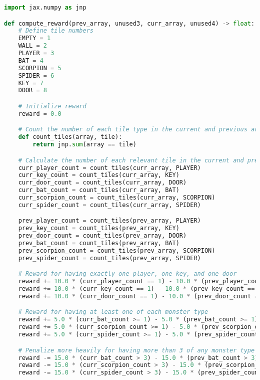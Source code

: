 \begin{tcolorbox}[colback=white, colframe=gray, title=Generated Reward Function Example, breakable]
\begin{lstlisting}[language=Python]
import jax.numpy as jnp

def compute_reward(prev_array, unused3, curr_array, unused4) -> float:
    # Define tile numbers
    EMPTY = 1
    WALL = 2
    PLAYER = 3
    BAT = 4
    SCORPION = 5
    SPIDER = 6
    KEY = 7
    DOOR = 8

    # Initialize reward
    reward = 0.0

    # Count the number of each tile type in the current and previous arrays
    def count_tiles(array, tile):
        return jnp.sum(array == tile)

    # Calculate the number of each relevant tile in the current and previous arrays
    curr_player_count = count_tiles(curr_array, PLAYER)
    curr_key_count = count_tiles(curr_array, KEY)
    curr_door_count = count_tiles(curr_array, DOOR)
    curr_bat_count = count_tiles(curr_array, BAT)
    curr_scorpion_count = count_tiles(curr_array, SCORPION)
    curr_spider_count = count_tiles(curr_array, SPIDER)

    prev_player_count = count_tiles(prev_array, PLAYER)
    prev_key_count = count_tiles(prev_array, KEY)
    prev_door_count = count_tiles(prev_array, DOOR)
    prev_bat_count = count_tiles(prev_array, BAT)
    prev_scorpion_count = count_tiles(prev_array, SCORPION)
    prev_spider_count = count_tiles(prev_array, SPIDER)

    # Reward for having exactly one player, one key, and one door
    reward += 10.0 * (curr_player_count == 1) - 10.0 * (prev_player_count == 1)
    reward += 10.0 * (curr_key_count == 1) - 10.0 * (prev_key_count == 1)
    reward += 10.0 * (curr_door_count == 1) - 10.0 * (prev_door_count == 1)

    # Reward for having at least one of each monster type
    reward += 5.0 * (curr_bat_count >= 1) - 5.0 * (prev_bat_count >= 1)
    reward += 5.0 * (curr_scorpion_count >= 1) - 5.0 * (prev_scorpion_count >= 1)
    reward += 5.0 * (curr_spider_count >= 1) - 5.0 * (prev_spider_count >= 1)

    # Penalize more heavily for having more than 3 of any monster type
    reward -= 15.0 * (curr_bat_count > 3) - 15.0 * (prev_bat_count > 3)
    reward -= 15.0 * (curr_scorpion_count > 3) - 15.0 * (prev_scorpion_count > 3)
    reward -= 15.0 * (curr_spider_count > 3) - 15.0 * (prev_spider_count > 3)


\end{lstlisting}
\end{tcolorbox}
